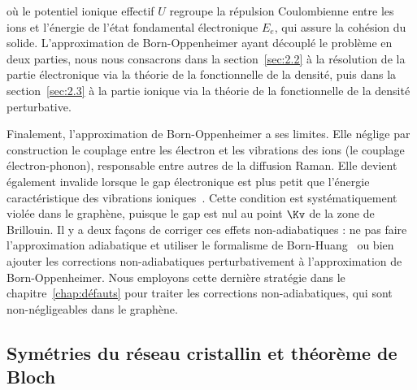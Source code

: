 où le potentiel ionique effectif $U$ regroupe la répulsion Coulombienne entre les ions et l'énergie de l'état fondamental électronique $E_e$, qui assure la cohésion du solide. L'approximation de Born-Oppenheimer ayant découplé le problème en deux parties, nous nous consacrons dans la section~\ref{sec:2.2} à la résolution de la partie électronique via la théorie de la fonctionnelle de la densité, puis dans la section~\ref{sec:2.3} à la partie ionique via la théorie de la fonctionnelle de la densité perturbative.

Finalement, l'approximation de Born-Oppenheimer a ses limites. Elle néglige par construction le couplage entre les électron et les vibrations des ions (le couplage électron-phonon), responsable entre autres de la diffusion Raman. Elle devient également invalide lorsque le gap électronique est plus petit que l'énergie caractéristique des vibrations ioniques~\cite{pisanaBornOppenheimerBreakdownGraphene2007}. Cette condition est systématiquement violée dans le graphène, puisque le gap est nul au point $\Kv$ de la zone de Brillouin. Il y a deux façons de corriger ces effets non-adiabatiques : ne pas faire l'approximation adiabatique et utiliser le formalisme de Born-Huang~\cite{bornDynamicalTheoryCrystal1998} ou bien ajouter les corrections non-adiabatiques perturbativement à l'approximation de Born-Oppenheimer. Nous employons cette dernière stratégie dans le chapitre~\ref{chap:défauts} pour traiter les corrections non-adiabatiques, qui sont non-négligeables dans le graphène.

\subsection{Symétries du réseau cristallin et théorème de Bloch}\label{sec:2.1.2}

